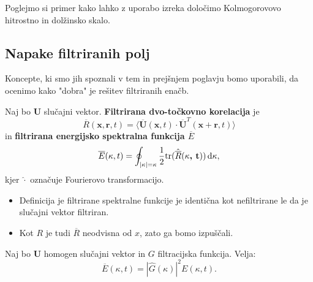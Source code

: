 \documentclass[mat2, tisk]{fmfdelo}
\newcommand{\bd}{\textbf}
\begin{document}
\begin{primer}
Poglejmo si primer kako lahko z uporabo izreka določimo Kolmogorovovo hitrostno in dolžinsko skalo.

\end{primer}

\subsection{Napake filtriranih polj}

Koncepte, ki smo jih spoznali v tem in prejšnjem poglavju bomo 
uporabili, da ocenimo kako "dobra" je rešitev filtriranih enačb.

\begin{definicija}
Naj bo $\bd{U}$ slučajni vektor. \bd{Filtrirana dvo-točkovno korelacija}
je 
\begin{equation}
\overline{R}(\bd{x},\bd{r},t) = \langle \overline{\bd{U}}(\bd{x}, t) \cdot \overline{\bd{U}}^T(\bd{x} + \bd{r}, t) \rangle
\end{equation} 
in \bd{filtrirana energijsko spektralna funkcija $\overline{E}$} 
\begin{equation}
\overline{E}(\kappa, t) = \oint_{|\bd{\text{$\kappa$}}| = \kappa} \frac{1}{2} \text{tr}(\hat{\overline{R}}(\bd{\text{$\kappa$}, t})) \dif \bd{\text{$\kappa$}},
\end{equation}
kjer $\hat{\cdot}$ označuje Fourierovo transformacijo.
\end{definicija}

\begin{opomba}
\hfill
\begin{itemize}
  \item Definicija je filtrirane spektralne funkcije je identična kot nefiltrirane 
  le da je slučajni vektor filtriran.
  \item Kot $R$ je tudi $\overline{R}$ neodvisna od $x$, zato ga bomo izpuščali.
\end{itemize}
\end{opomba}

\begin{lema}
Naj bo $\bd{U}$ homogen slučajni vektor in $G$ filtracijska funkcija. Velja: 
\begin{equation}
\overline{E}(\kappa, t) = |\hat{G}(\kappa)|^2 E(\kappa, t).
\end{equation}
\end{lema}
\end{document}
